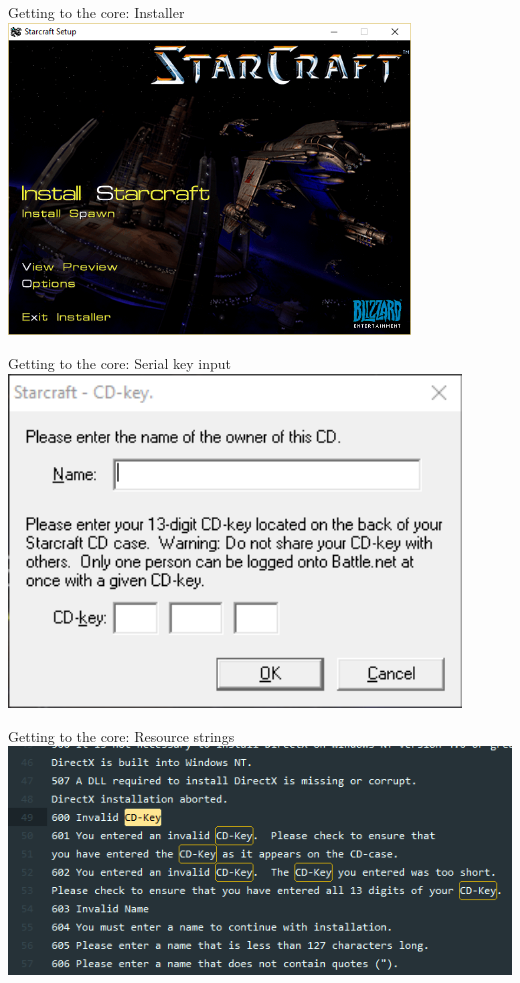 \documentclass[10pt, compress]{beamer}
\begin{document}
\begin{frame}{Getting to the core: Installer}
	\includegraphics[width=0.8\textwidth]{images/sc1-1-setup.png}
\end{frame}

\begin{frame}{Getting to the core: Serial key input}
	\includegraphics[width=0.9\textwidth]{images/sc1-2-input-key.png}
\end{frame}

\begin{frame}{Getting to the core: Resource strings}
	\includegraphics[width=\textwidth]{images/sc1-3-resources-strings.png}
\end{frame}
\end{document}
